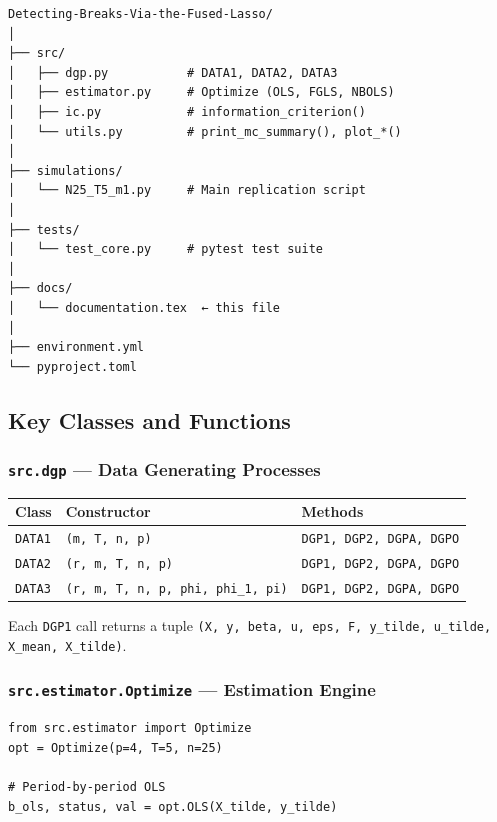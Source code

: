 \documentclass[12pt, a4paper]{article}
\theoremstyle{plain}
\theoremstyle{definition}
\theoremstyle{remark}
\begin{document}
\begin{onehalfspacing}
\begin{verbatim}
Detecting-Breaks-Via-the-Fused-Lasso/
│
├── src/
│   ├── dgp.py           # DATA1, DATA2, DATA3
│   ├── estimator.py     # Optimize (OLS, FGLS, NBOLS)
│   ├── ic.py            # information_criterion()
│   └── utils.py         # print_mc_summary(), plot_*()
│
├── simulations/
│   └── N25_T5_m1.py     # Main replication script
│
├── tests/
│   └── test_core.py     # pytest test suite
│
├── docs/
│   └── documentation.tex  ← this file
│
├── environment.yml
└── pyproject.toml
\end{verbatim}

\subsection{Key Classes and Functions}

\subsubsection{\texttt{src.dgp} — Data Generating Processes}

\begin{center}
\begin{tabular}{lll}
  \toprule
  Class & Constructor & Methods \\
  \midrule
  \texttt{DATA1} & \texttt{(m, T, n, p)} & \texttt{DGP1, DGP2, DGPA, DGPO} \\
  \texttt{DATA2} & \texttt{(r, m, T, n, p)} & \texttt{DGP1, DGP2, DGPA, DGPO} \\
  \texttt{DATA3} & \texttt{(r, m, T, n, p, phi, phi\_1, pi)} & \texttt{DGP1, DGP2, DGPA, DGPO} \\
  \bottomrule
\end{tabular}
\end{center}

Each \texttt{DGP1} call returns a tuple
\texttt{(X, y, beta, u, eps, F, y\_tilde, u\_tilde, X\_mean, X\_tilde)}.

\subsubsection{\texttt{src.estimator.Optimize} — Estimation Engine}

\begin{lstlisting}[caption={Using the Optimize class.}]
from src.estimator import Optimize
opt = Optimize(p=4, T=5, n=25)

# Period-by-period OLS
b_ols, status, val = opt.OLS(X_tilde, y_tilde)


\end{lstlisting}
\end{onehalfspacing}
\end{document}
